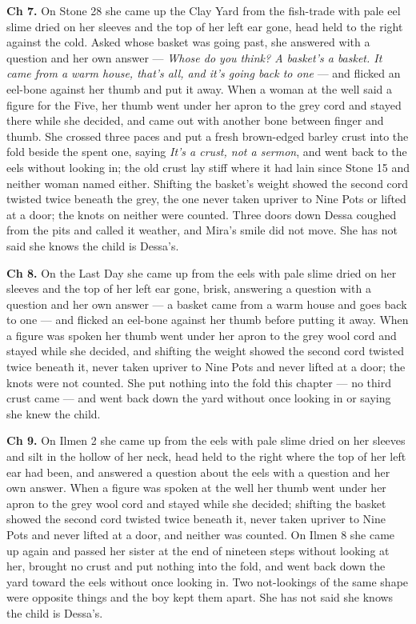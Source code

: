\documentclass{design/chronicle}
\begin{document}
{\textbf{Ch 7.} On Stone 28 she came up the Clay Yard from the fish-trade with pale eel slime dried on her sleeves and the top of her left ear gone, head held to the right against the cold. Asked whose basket was going past, she answered with a question and her own answer --- \emph{Whose do you think? A basket’s a basket. It came from a warm house, that’s all, and it’s going back to one} --- and flicked an eel-bone against her thumb and put it away. When a woman at the well said a figure for the Five, her thumb went under her apron to the grey cord and stayed there while she decided, and came out with another bone between finger and thumb. She crossed three paces and put a fresh brown-edged barley crust into the fold beside the spent one, saying \emph{It’s a crust, not a sermon}, and went back to the eels without looking in; the old crust lay stiff where it had lain since Stone 15 and neither woman named either. Shifting the basket’s weight showed the second cord twisted twice beneath the grey, the one never taken upriver to Nine Pots or lifted at a door; the knots on neither were counted. Three doors down Dessa coughed from the pits and called it weather, and Mira’s smile did not move. She has not said she knows the child is Dessa’s.

\textbf{Ch 8.} On the Last Day she came up from the eels with pale slime dried on her sleeves and the top of her left ear gone, brisk, answering a question with a question and her own answer --- a basket came from a warm house and goes back to one --- and flicked an eel-bone against her thumb before putting it away. When a figure was spoken her thumb went under her apron to the grey wool cord and stayed while she decided, and shifting the weight showed the second cord twisted twice beneath it, never taken upriver to Nine Pots and never lifted at a door; the knots were not counted. She put nothing into the fold this chapter --- no third crust came --- and went back down the yard without once looking in or saying she knew the child.

\textbf{Ch 9.} On Ilmen 2 she came up from the eels with pale slime dried on her sleeves and silt in the hollow of her neck, head held to the right where the top of her left ear had been, and answered a question about the eels with a question and her own answer. When a figure was spoken at the well her thumb went under her apron to the grey wool cord and stayed while she decided; shifting the basket showed the second cord twisted twice beneath it, never taken upriver to Nine Pots and never lifted at a door, and neither was counted. On Ilmen 8 she came up again and passed her sister at the end of nineteen steps without looking at her, brought no crust and put nothing into the fold, and went back down the yard toward the eels without once looking in. Two not-lookings of the same shape were opposite things and the boy kept them apart. She has not said she knows the child is Dessa’s.

}
\end{document}
